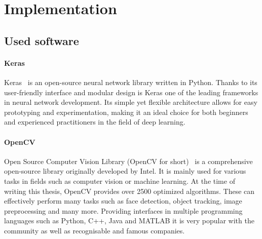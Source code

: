 \chapter{Implementation}

\section{Used software}
\subsubsection{Keras}
Keras~\cite{keras} is an open-source neural network library written in Python. Thanks to its user-friendly interface and modular design is Keras one of the leading frameworks in neural network development. Its simple yet flexible architecture allows for easy prototyping and experimentation, making it an ideal choice for both beginners and experienced practitioners in the field of deep learning.
\subsubsection{OpenCV }
Open Source Computer Vision Library (OpenCV for short)~\cite{opencv} is a comprehensive open-source library originally developed by Intel. It is mainly used for various tasks in fields such as computer vision or machine learning. At the time of writing this thesis, OpenCV provides over 2500 optimized algorithms. These can effectively perform many tasks such as face detection, object tracking, image preprocessing and many more. Providing interfaces in multiple programming languages such as Python, C++, Java and MATLAB it is very popular with the community as well as recognisable and famous companies.


